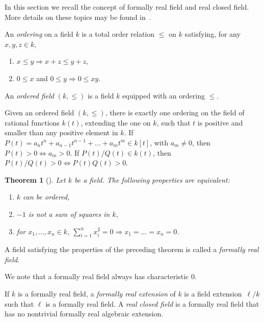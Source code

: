 \documentclass[10pt,a4paper]{amsart}
\numberwithin{equation}{section}
\newtheorem{Theorem}{Theorem}[section]
\begin{document}
In this section we recall the concept of formally real field and real closed field. More details on these topics may be found in~\cite{BCR,Pre}.

\begin{Definition} An \emph{ordering} on a field $k$ is a total order relation $\leq$ on $k$ satisfying, for any $x,y,z \in k$,
\begin{enumerate}\itemsep=0pt
\item[$(i)$] $x\leq y \Rightarrow x+z \leq y+z$,
\item[$(ii)$] $0\leq x$ and $0\leq y \Rightarrow 0\leq xy$.
\end{enumerate}

An \emph{ordered field} $(k,\leq)$ is a field $k$ equipped with an ordering $\leq$.
\end{Definition}

\begin{Remark}\label{ord}
Given an ordered field $(k,\leq)$, there is exactly one ordering on the field of rational functions $k(t)$, extending the one on $k$, such that $t$ is positive and smaller than any positive element in $k$. If $P(t)=a_n t^n+a_{n-1}t^{n-1}+\dots+a_m t^m \in k[t]$, with $a_m \neq 0$, then $P(t) >0 \Leftrightarrow a_m>0$. If $P(t)/Q(t) \in k(t)$, then $P(t)/Q(t)>0 \Leftrightarrow P(t)Q(t)>0$.
\end{Remark}

\begin{Theorem}[{\cite[Theorem~1.1.8]{BCR}}] Let $k$ be a field. The following properties are equivalent:
\begin{enumerate}\itemsep=0pt
\item[$(i)$] $k$ can be ordered,
\item[$(ii)$] $-1$ is not a sum of squares in $k$,
\item[$(iii)$] for $x_1,\dots,x_n \in k$, $\sum_{i=1}^n x_i^2=0 \Rightarrow x_1=\dots =x_n=0$.
\end{enumerate}
\end{Theorem}

\begin{Definition} A field satisfying the properties of the preceding theorem is called a \emph{formally real field}.
\end{Definition}

We note that a formally real field always has characteristic $0$.


\begin{Definition} If $k$ is a formally real field, a \emph{formally real extension} of $k$ is a field extension~$\ell/k$ such that $\ell$ is a formally real field. A \emph{real closed field} is a formally real field that has no nontrivial formally real algebraic extension.
\end{Definition}
\end{document}
